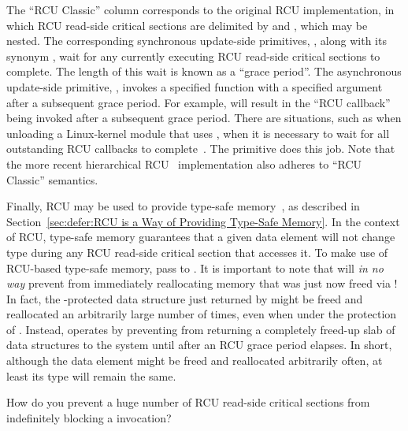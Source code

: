 The ``RCU Classic'' column corresponds to the original RCU implementation,
in which RCU read-side critical sections are delimited by
 and , which
may be nested.
The corresponding synchronous update-side primitives,
, along with its synonym
, wait for any currently executing
RCU read-side critical sections to complete.
The length of this wait is known as a ``grace period''.
The asynchronous update-side primitive, ,
invokes a specified function with a specified argument after a
subsequent grace period.
For example,  will result in
the ``RCU callback'' 
being invoked after a subsequent grace period.
There are situations,
such as when unloading a Linux-kernel module that uses ,
when it is necessary to wait for all
outstanding RCU callbacks to complete~\cite{PaulEMcKenney2007rcubarrier}.
The  primitive does this job.
Note that the more recent hierarchical
RCU~\cite{PaulEMcKenney2008HierarchicalRCU}
implementation also adheres to ``RCU Classic'' semantics.

Finally, RCU may be used to provide
type-safe memory~\cite{Cheriton96a}, as described in
Section~\ref{sec:defer:RCU is a Way of Providing Type-Safe Memory}.
In the context of RCU, type-safe memory guarantees that a given
data element will not change type during any RCU read-side critical section
that accesses it.
To make use of RCU-based type-safe memory, pass
 to
.
It is important to note that  will
\emph{in no way}
prevent  from immediately reallocating
memory that was just now freed via !
In fact, the -protected data structure
just returned by  might be freed and reallocated
an arbitrarily large number of times, even when under the protection
of .
Instead,  operates by preventing
from returning a completely freed-up slab of data structures
to the system until after an RCU grace period elapses.
In short, although the data element might be freed and reallocated arbitrarily
often, at least its type will remain the same.

\QuickQuiz{}
	How do you prevent a huge number of RCU read-side critical
	sections from indefinitely blocking a 
	invocation?
 \QuickQuizEnd

